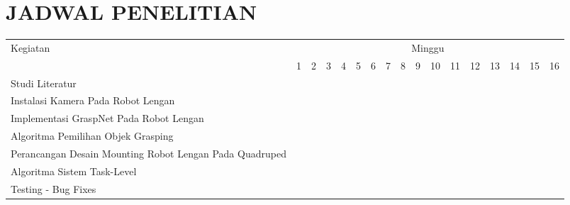 \chapter{JADWAL PENELITIAN}

\newcommand{\w}{}
\newcommand{\G}{\cellcolor{gray}}
\begin{table}[H]
  \label{tbl:timeline}
  \begin{tabular}{|p{3.5cm}|c|c|c|c|c|c|c|c|c|c|c|c|c|c|c|c|}

    \hline
    \multirow{2}{*}{Kegiatan} & \multicolumn{16}{|c|}{Minggu}                                                                       \\
    \cline{2-17}              &
    1                         & 2                             & 3  & 4  & 5  & 6  & 7  & 8  & 9  & 10 & 11 & 12 & 13 & 14 & 15 & 16 \\
    \hline

    Studi Literatur           &
    \G                        & \G                            & \w & \w & \w & \w & \w & \w & \w & \w & \w & \w & \w & \w & \w & \w \\
    \hline

    Instalasi Kamera Pada Robot Lengan           &
    \w                        & \w                            & \G & \G & \w & \w & \w & \w & \w & \w & \w & \w & \w & \w & \w & \w \\
    \hline

    Implementasi GraspNet Pada Robot Lengan              &
    \w                        & \w                            & \w & \w & \G & \G & \G & \w & \w & \w & \w & \w & \w & \w & \w & \w \\
    \hline

    Algoritma Pemilihan Objek Grasping       &
    \w                        & \w                            & \w & \w & \w & \w & \G & \G & \w & \w & \w & \w & \w & \w & \w & \w \\
    \hline

    Perancangan Desain Mounting Robot Lengan Pada Quadruped       &
    \w                        & \w                            & \w & \w & \w & \w & \w & \w & \G & \G & \w & \w & \w & \w & \w & \w \\
    \hline

    Algoritma Sistem Task-Level       &
    \w                        & \w                            & \w & \w & \w & \w & \w & \w & \w & \w & \G & \G & \G & \G & \w & \w \\
    \hline

    Testing - Bug Fixes       &
    \w                        & \w                            & \w & \w & \w & \w & \w & \w & \w & \w & \w & \w & \w & \w & \G & \G \\
    \hline
  \end{tabular}
\end{table}


